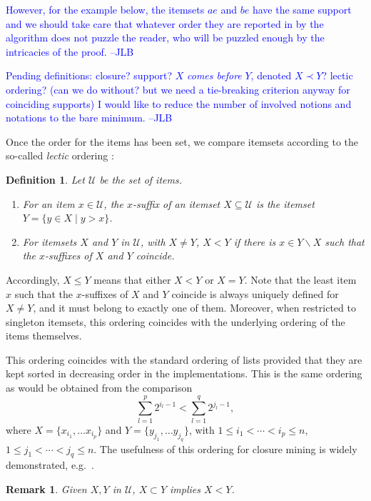 \documentclass{article}
\newtheorem{definition}{Definition}
\newtheorem{remark}{Remark}
\newcommand{\added}[1]{\textcolor{blue}{#1}}
\def\U{\mathcal{U}}
\def\bef{\prec}
\begin{document}
\added{However, for the example below, the itemsets $ae$ and $be$ 
have the same support and we should take care that whatever order 
they are reported in by the algorithm does not puzzle the reader, 
who will be puzzled enough by the intricacies of the proof. --JLB}

\added{Pending definitions: closure? support? $X$ \emph{comes before} $Y$,
denoted $X\bef Y$? lectic ordering? (can we do without? but we need 
a tie-breaking criterion anyway for coinciding supports)
I would like to reduce the number of involved notions and notations
to the bare minimum. --JLB}



Once the order for the items has been set, we compare itemsets according to the so-called \emph{lectic} ordering \cite{Gant10}:

\begin{definition}
\label{df:lectic}
Let $\U$ be the set of items.
\begin{enumerate}
\item 
For an item $x \in \U$, the $x$-\emph{suffix} of an itemset $X \subseteq \U$ is 
the itemset $Y = \{ y\in X \mid y > x\}$.
\item 
For itemsets $X$ and $Y$ in $\U$, with $X\neq Y$,
$X < Y$ if there is $x\in Y\backslash X$ such that
the $x$-suffixes of $X$ and $Y$ coincide.
\end{enumerate}
\end{definition}

Accordingly, $X\leq Y$ means that either $X < Y$ or $X = Y$.
Note that the least item $x$ such that 
the $x$-suffixes of $X$ and $Y$ coincide
is always uniquely defined for $X\neq Y$,
and it must belong to exactly one of them. Moreover, when restricted to singleton itemsets, this ordering coincides with the underlying ordering of the items themselves.


This ordering coincides with the
standard ordering of lists provided that they are kept sorted
in decreasing order in the implementations.
This is the same ordering as would be obtained from the comparison
$$\sum^p_{l=1} 2^{i_l-1} <\sum^q_{l=1} 2^{j_l-1},$$
\noindent where $X=\{x_{i_1},\ldots x_{i_p}\}$ and $Y=\{y_{j_1}, \ldots y_{j_q}\}$,
with $1\leq i_1<\cdots<i_p \leq n$, $1\leq j_1<\cdots<j_q \leq n$.
The usefulness of this ordering for closure mining is widely
demonstrated, e.g.~\cite{Gant10,UAUA03,ZakHsi05}.

\begin{remark}\label{rem:lecticorder}
Given $X,Y$ in $\U$, $X \subset Y$ implies $X<Y$.
\end{remark}
\end{document}
